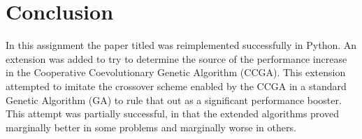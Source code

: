 \section{Conclusion} \label{sec:conclusion}

In this assignment the paper titled \cite{original-paper} was reimplemented successfully in Python.
An extension was added to try to determine the source of the performance increase in the Cooperative Coevolutionary Genetic Algorithm (CCGA).
This extension attempted to imitate the crossover scheme enabled by the CCGA in a standard Genetic Algorithm (GA) to rule that out as a significant performance booster.
This attempt was partially successful, in that the extended algorithms proved marginally better in some problems and marginally worse in others.
